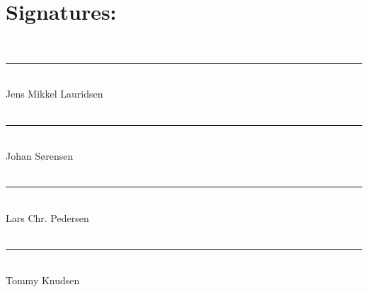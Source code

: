 \chapter*{Signatures:}
\\
\noindent\rule{8cm}{0.03cm}\\
Jens Mikkel Lauridsen\\
\\
\noindent\rule{8cm}{0.03cm}\\
Johan Sørensen\\
\\
\noindent\rule{8cm}{0.03cm}\\ 
Lars Chr. Pedersen\\ 
\\
\noindent\rule{8cm}{0.03cm}\\
Tommy Knudsen\\
